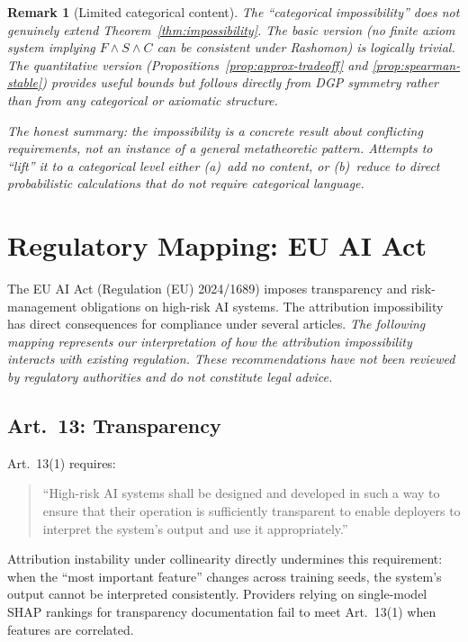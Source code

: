 \documentclass{article}
\newtheorem{remark}[theorem]{Remark}
\begin{document}
\begin{remark}[Limited categorical content]
\label{rem:categorical-limited}
The ``categorical impossibility'' does not genuinely extend
Theorem~\ref{thm:impossibility}. The basic version (no finite axiom system implying
$F \wedge S \wedge C$ can be consistent under Rashomon) is
logically trivial. The quantitative version
(Propositions~\ref{prop:approx-tradeoff} and
\ref{prop:spearman-stable}) provides useful bounds but
follows directly from DGP symmetry rather than from
any categorical or axiomatic structure.

The honest summary: the impossibility is a \emph{concrete}
result about conflicting requirements, not an instance of a
general metatheoretic pattern. Attempts to ``lift'' it to a
categorical level either (a)~add no content, or (b)~reduce to
direct probabilistic calculations that do not require categorical
language.
\end{remark}

\section{Regulatory Mapping: EU AI Act}
\label{sec:regulatory-mapping}

The EU AI Act (Regulation (EU) 2024/1689) imposes transparency and risk-management obligations on high-risk AI systems. The attribution impossibility has direct consequences for compliance under several articles. \emph{The following mapping represents our interpretation of how the attribution impossibility interacts with existing regulation. These recommendations have not been reviewed by regulatory authorities and do not constitute legal advice.}

\subsection*{Art.~13: Transparency}

Art.~13(1) requires:
\begin{quote}
``High-risk AI systems shall be designed and developed in such a way to ensure that their operation is sufficiently transparent to enable deployers to interpret the system's output and use it appropriately.''
\end{quote}
Attribution instability under collinearity directly undermines this requirement: when the ``most important feature'' changes across training seeds, the system's output cannot be interpreted consistently. Providers relying on single-model SHAP rankings for transparency documentation fail to meet Art.~13(1) when features are correlated.
\end{document}
